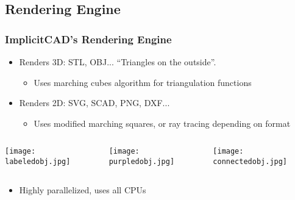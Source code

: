\documentclass{beamer}
\begin{document}
\subsection{Rendering Engine}
\begin{frame}
\frametitle{ImplicitCAD's Rendering Engine}
\begin{itemize}
\item Renders 3D: STL, OBJ... ``Triangles on the outside''.
\begin{itemize}
\item Uses marching cubes algorithm for triangulation functions
\end{itemize}
\item Renders 2D: SVG, SCAD, PNG, DXF...
\begin{itemize}
\item Uses modified marching squares, or ray tracing depending on format
\end{itemize}
\end{itemize}
\begin{columns}
  \begin{column}{0.33\textwidth}
    \texttt{[image: labeledobj.jpg]}
  \end{column}
  \begin{column}{0.33\textwidth}
    \texttt{[image: purpledobj.jpg]}
  \end{column}
  \begin{column}{0.33\textwidth}
    \texttt{[image: connectedobj.jpg]}
  \end{column}
\end{columns}
\begin{itemize}
\item Highly parallelized, uses all CPUs
\end{itemize}
\end{frame}
\end{document}
